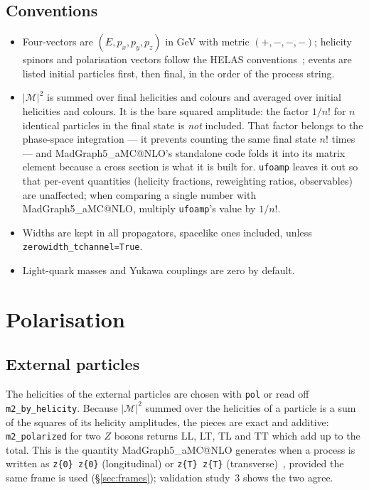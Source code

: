 \documentclass[11pt]{article}
\makeatletter
\newcommand{\ufoamp}{\texttt{ufoamp}}
\newcommand{\mg}{MadGraph5\_aMC@NLO}
\newcommand{\code}[1]{\texttt{#1}}
\newcommand{\M}{\mathcal{M}}
\makeatother
\begin{document}
\subsection{Conventions}
\begin{itemize}[nosep]
\item Four-vectors are $(E,p_x,p_y,p_z)$ in GeV with metric $(+,-,-,-)$; helicity spinors and polarisation vectors follow the HELAS conventions~\cite{Murayama:1992gi,Hagiwara:1985yu}; events are listed initial particles first, then final, in the order of the process string.
\item $|\M|^2$ is summed over final helicities and colours and averaged over initial helicities and colours. It is the bare squared amplitude: the factor $1/n!$ for $n$ identical particles in the final state is \emph{not} included. That factor belongs to the phase-space integration --- it prevents counting the same final state $n!$ times --- and \mg's standalone code folds it into its matrix element because a cross section is what it is built for. \ufoamp{} leaves it out so that per-event quantities (helicity fractions, reweighting ratios, observables) are unaffected; when comparing a single number with \mg, multiply \ufoamp's value by $1/n!$.
\item Widths are kept in all propagators, spacelike ones included, unless \code{zerowidth\_tchannel=True}.
\item Light-quark masses and Yukawa couplings are zero by default.
\end{itemize}

\section{Polarisation}
\subsection{External particles}
The helicities of the external particles are chosen with \code{pol} or read off \code{m2\_by\_helicity}. Because $|\M|^2$ summed over the helicities of a particle is a sum of the squares of its helicity amplitudes, the pieces are exact and additive: \code{m2\_polarized} for two $Z$ bosons returns LL, LT, TL and TT which add up to the total. This is the quantity \mg{} generates when a process is written as \code{z\{0\} z\{0\}} (longitudinal) or \code{z\{T\} z\{T\}} (transverse)~\cite{BuarqueFranzosi:2019boy}, provided the same frame is used (\S\ref{sec:frames}); validation study~3 shows the two agree.
\end{document}
